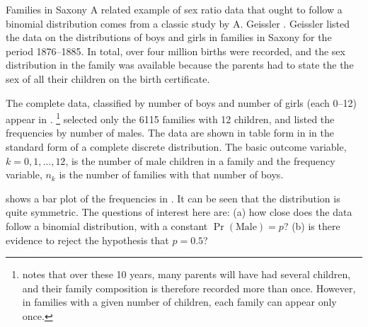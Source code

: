 \documentclass[11pt]{book}
\renewenvironment{knitrout}{\small\renewcommand{\baselinestretch}{.85}}{} %
\begin{document}
\begin{Example}[saxony1]{Families in Saxony}
A related example of sex ratio data that ought to follow a binomial distribution
comes from a classic study by A. Geissler \citeyearpar{Geissler:1889}.
Geissler listed the data on the distributions of boys and girls in families
in Saxony for the period 1876--1885. In total, over four million births were
recorded, and the sex distribution in the family was available because the parents had to state the the sex of all their children on
the birth certificate.%

The complete data, classified by number of boys and number of girls
(each 0--12) appear in \citet[Table 1]{Edwards:1958}.%
\footnote{
\citet{Edwards:1958} notes that over these 10 years, many parents
will have had several children, and their family composition 
is therefore recorded more than once.  However, in families with a given
number of children, each family can appear only once.
}
\citet[Table 6.2]{Lindsey:95} selected only the 6115 families with 
12 children, and listed the frequencies by number of males.  The
data are shown in table form in  in the standard form
of a complete discrete distribution.  The basic outcome variable, 
$k = 0, 1, \dots, 12$, is the number of male children in a family
and the frequency variable, $n_k$ is the number of families with that
number of boys.



 shows a bar plot of the frequencies in .
It can be seen that the distribution is quite symmetric.  The questions of interest
here are: 
(a) how close does the data follow a binomial distribution, with a constant
$\Pr(\mathrm{Male}) = p$?
(b) is there evidence to reject the hypothesis that $ p = 0.5$?

\begin{knitrout}
\color{fgcolor}\begin{kframe}
\begin{alltt}
 \hlstd{=}\hlstd{)}
 \hlstd{=}\hlstd{,} \hlstd{=}\hlstd{,}
        \hlstd{=}\hlstd{,} \hlstd{=}\hlstd{)}
\end{alltt}
\end{kframe}\begin{figure}[!htbp]



\end{figure}
\end{knitrout}
\end{Example}
\end{document}

